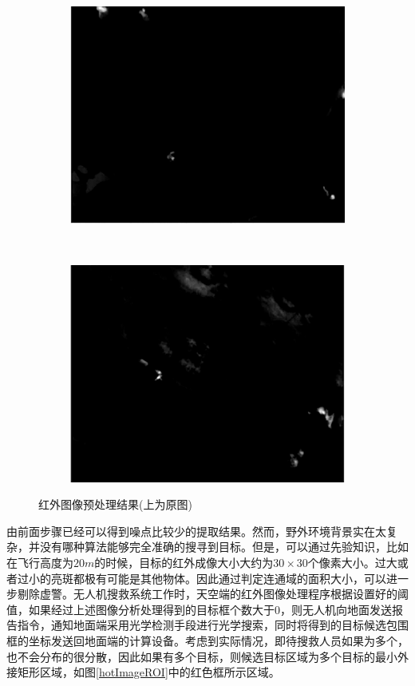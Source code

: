 \begin{figure}[h]
\begin{subfigure}[h]{0.3\textwidth}
        \includegraphics[width=\textwidth]{figures/红外图像预处理结果5.png}
    \end{subfigure}
    ~
    \begin{subfigure}[h]{0.3\textwidth}
        \includegraphics[width=\textwidth]{figures/红外图像预处理结果6.png}
    \end{subfigure}
    \caption{红外图像预处理结果(上为原图)}\label{hotImageResult}
\end{figure}


由前面步骤已经可以得到噪点比较少的提取结果。然而，野外环境背景实在太复杂，并没有哪种算法能够完全准确的搜寻到目标。但是，可以通过先验知识，比如在飞行高度为$20m$的时候，目标的红外成像大小大约为$30\times30$个像素大小。过大或者过小的亮斑都极有可能是其他物体。因此通过判定连通域的面积大小，可以进一步剔除虚警。无人机搜救系统工作时，天空端的红外图像处理程序根据设置好的阈值，如果经过上述图像分析处理得到的目标框个数大于$0$，则无人机向地面发送报告指令，通知地面端采用光学检测手段进行光学搜索，同时将得到的目标候选包围框的坐标发送回地面端的计算设备。考虑到实际情况，即待搜救人员如果为多个，也不会分布的很分散，因此如果有多个目标，则候选目标区域为多个目标的最小外接矩形区域，如图\ref{hotImageROI}中的红色框所示区域。

